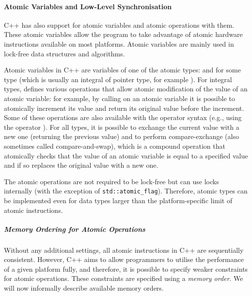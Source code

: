 \paragraph{Atomic Variables and Low-Level Synchronisation}
%
C++ has also support for atomic variables and atomic operations with them.
These atomic variables allow the program to take advantage of atomic hardware
instructions available on most platforms.
Atomic variables are mainly used in lock-free data structures and algorithms.

Atomic variables in C++ are variables of one of the atomic types:
 and  for some type  (which is
usually an integral of pointer type, for example ).
For integral types,  defines various operations that allow
atomic modification of the value of an atomic variable: for example, by calling
 on an atomic variable it is possible to atomically increment
its value and return its original value before the increment.
Some of these operations are also available with the operator syntax (e.g.,
using the operator \cpp{+=}).
For all types, it is possible to exchange the current value with a new one
(returning the previous value) and to perform compare-exchange (also sometimes
called compare-and-swap), which is a compound operation that atomically checks
that the value of an atomic variable is equal to a specified value and if so
replaces the original value with a new one.

The atomic operations are not required to be lock-free but can use locks
internally (with the exception of \texttt{std::atomic\_flag}).
Therefore, atomic types can be implemented even for data types larger than the platform-specific limit of atomic instructions.

\subparagraph{Memory Ordering for Atomic Operations} \label{sec:prelim:cppmemord}

Without any additional settings, all atomic instructions in C++ are sequentially
consistent.
However, C++ aims to allow programmers to utilise the performance of a given platform fully, and therefore, it is possible to specify weaker constraints for
atomic operations.
These constraints are specified using a \emph{memory order}.
We will now informally describe available memory orders.

